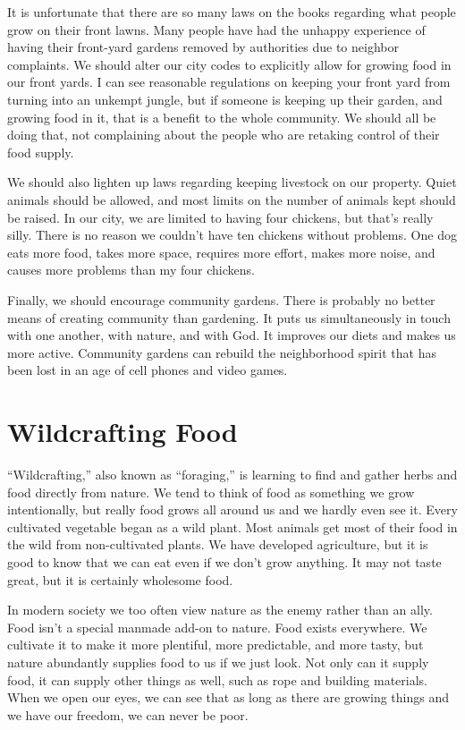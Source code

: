\begin{policynote}
It is unfortunate that there are so many laws on the books regarding
what people grow on their front lawns. Many people have had the unhappy
experience of having their front-yard gardens removed by authorities
due to neighbor complaints. We should alter our city codes to
explicitly allow for growing food in our front yards. I can see
reasonable regulations on keeping your front yard from turning into an
unkempt jungle, but if someone is keeping up their garden, and growing
food in it, that is a benefit to the whole community. We should all be
doing that, not complaining about the people who are retaking control
of their food supply.

We should also lighten up laws regarding keeping livestock on our
property. Quiet animals should be allowed, and most limits on the
number of animals kept should be raised. In our city, we are limited to
having four chickens, but that’s really silly. There is no reason we
couldn’t have ten chickens without problems. One dog eats more food,
takes more space, requires more effort, makes more noise, and causes
more problems than my four chickens.

Finally, we should encourage community gardens. There is probably no
better means of creating community than gardening. It puts us
simultaneously in touch with one another, with nature, and with God. It
improves our diets and makes us more active. Community gardens can
rebuild the neighborhood spirit that has been lost in an age of cell
phones and video games.
\end{policynote}

\section{Wildcrafting Food}

``Wildcrafting,'' also known as ``foraging,'' is learning to find and gather herbs and food directly
from nature. We tend to think of food as something we grow
intentionally, but really food grows all around us and we hardly even
see it. Every cultivated vegetable began as a wild plant. Most animals
get most of their food
in the wild from
non-cultivated plants. We have developed agriculture, but it is good to
know that we can eat even if we don’t grow anything. It may not taste
great, but it is certainly wholesome food.

In modern society we too often view nature as the enemy rather than an
ally. Food isn’t a special manmade add-on to nature. Food exists
everywhere. We cultivate it to make it more plentiful, more
predictable, and more tasty, but nature abundantly supplies food to us
if we just look. Not only can it supply food, it can supply other
things as
well, such as rope
and building materials. When we open our eyes, we can see that as long
as there are growing things and we have our freedom, we can never be
poor.

